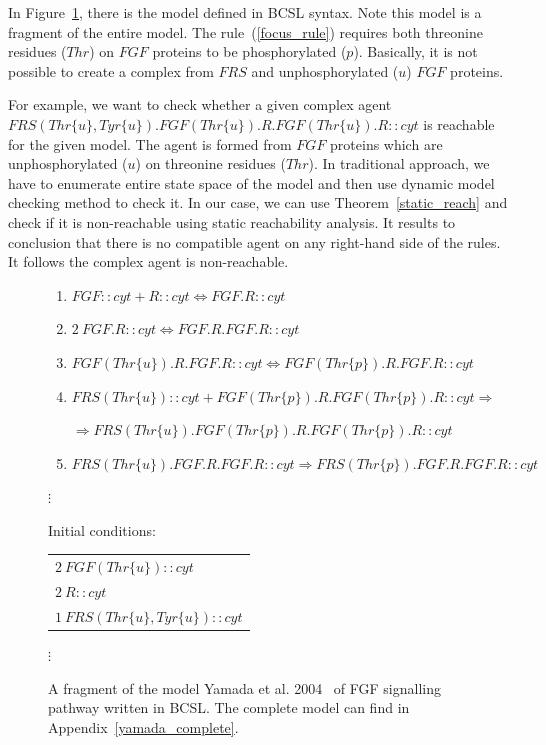 \documentclass[12pt, twoside]{fithesis2} %
\begin{document}
In Figure~\ref{fgf_fragment}, there is the model defined in BCSL syntax. Note this model is a fragment of the entire model. The rule~(\ref{focus_rule}) requires both threonine residues ($Thr$) on $FGF$ proteins to be phosphorylated ($p$). Basically, it is not possible to create a complex from $FRS$ and unphosphorylated ($u$) $FGF$ proteins.

For example, we want to check whether a given complex agent {\small $FRS(Thr\{u\}, Tyr\{u\}).FGF(Thr\{u\}).R.FGF(Thr\{u\}).R::cyt$} is reachable for the given model. The agent is formed from $FGF$ proteins which are unphosphorylated ($u$) on threonine residues ($Thr$). In traditional approach, we have to enumerate entire state space of the model and then use dynamic model checking method to check it. In our case, we can use Theorem~\ref{static_reach} and check if it is non-reachable using static reachability analysis. It results to conclusion that there is no compatible agent on any right-hand side of the rules. It follows the complex agent is non-reachable.

\begin{figure}[!h]
{\footnotesize
\begin{center}
\begin{enumerate}
\item $FGF::cyt + R::cyt \Leftrightarrow FGF.R::cyt$ 
\item $2~ FGF.R::cyt \Leftrightarrow FGF.R.FGF.R::cyt$
\item $FGF(Thr\{u\}).R.FGF.R::cyt \Leftrightarrow FGF(Thr\{p\}).R.FGF.R::cyt$ 
\item \label{focus_rule} $FRS(Thr\{u\})::cyt + FGF(Thr\{p\}).R.FGF(Thr\{p\}).R::cyt \Rightarrow$ 

$\Rightarrow FRS(Thr\{u\}).FGF(Thr\{p\}).R.FGF(Thr\{p\}).R::cyt$ 

\item $FRS(Thr\{u\}).FGF.R.FGF.R::cyt \Rightarrow FRS(Thr\{p\}).FGF.R.FGF.R::cyt$ 

\end{enumerate}

$\vdots$

\vspace*{0.5cm}
Initial conditions:
\begin{tabular}{l}
$2~ FGF(Thr\{u\})::cyt$\\
$2~ R::cyt$\\
$1~ FRS(Thr\{u\}, Tyr\{u\})::cyt$\\
\end{tabular}

$\vdots$

\end{center}

}
\caption{A fragment of the model Yamada et al. 2004~\cite{yamada2004model} of FGF signalling pathway written in BCSL. The complete model can find in Appendix~\ref{yamada_complete}.}\label{fgf_fragment}
\end{figure}
\end{document}
